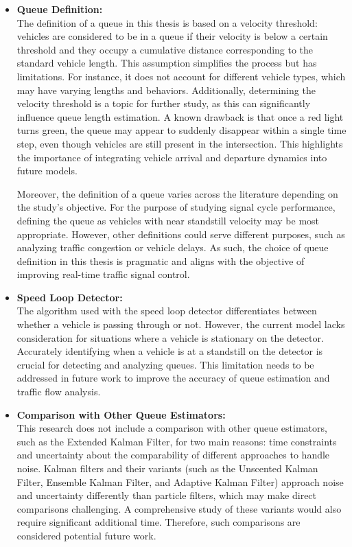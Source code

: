 \begin{itemize}
    \item \textbf{Queue Definition:} \\
    The definition of a queue in this thesis is based on a velocity threshold: vehicles are considered to be in a queue if their velocity is below a certain threshold and they occupy a cumulative distance corresponding to the standard vehicle length. This assumption simplifies the process but has limitations. For instance, it does not account for different vehicle types, which may have varying lengths and behaviors. Additionally, determining the velocity threshold is a topic for further study, as this can significantly influence queue length estimation. A known drawback is that once a red light turns green, the queue may appear to suddenly disappear within a single time step, even though vehicles are still present in the intersection. This highlights the importance of integrating vehicle arrival and departure dynamics into future models.

    Moreover, the definition of a queue varies across the literature depending on the study's objective. For the purpose of studying signal cycle performance, defining the queue as vehicles with near standstill velocity may be most appropriate. However, other definitions could serve different purposes, such as analyzing traffic congestion or vehicle delays. As such, the choice of queue definition in this thesis is pragmatic and aligns with the objective of improving real-time traffic signal control.

    \item \textbf{Speed Loop Detector:} \\
    The algorithm used with the speed loop detector differentiates between whether a vehicle is passing through or not. However, the current model lacks consideration for situations where a vehicle is stationary on the detector. Accurately identifying when a vehicle is at a standstill on the detector is crucial for detecting and analyzing queues. This limitation needs to be addressed in future work to improve the accuracy of queue estimation and traffic flow analysis.

    \item \textbf{Comparison with Other Queue Estimators:} \\
    This research does not include a comparison with other queue estimators, such as the Extended Kalman Filter, for two main reasons: time constraints and uncertainty about the comparability of different approaches to handle noise. Kalman filters and their variants (such as the Unscented Kalman Filter, Ensemble Kalman Filter, and Adaptive Kalman Filter) approach noise and uncertainty differently than particle filters, which may make direct comparisons challenging. A comprehensive study of these variants would also require significant additional time. Therefore, such comparisons are considered potential future work.
\end{itemize}

